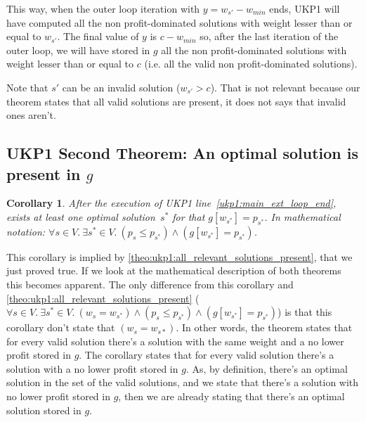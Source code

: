 \documentclass[12pt]{article}
\newtheorem{corollary}{Corollary}
\begin{document}
This way, when the outer loop iteration with \(y = w_{s'}-w_{min}\) ends, UKP1 will have computed all the non profit-dominated solutions with weight lesser than or equal to \(w_{s'}\). The final value of \(y\) is \(c-w_{min}\) so, after the last iteration of the outer loop, we will have stored in \(g\) all the non profit-dominated solutions with weight lesser than or equal to \(c\) (i.e. all the valid non profit-dominated solutions).

Note that \(s'\) can be an invalid solution (\(w_{s'} > c\)). That is not relevant because our theorem states that all valid solutions are present, it does not says that invalid ones aren't.

\subsection{UKP1 Second Theorem: An optimal solution is present in \(g\)}

\begin{corollary}\label{theo:ukp1:opt_is_present}
After the execution of UKP1 line~\ref{ukp1:main_ext_loop_end}, exists at least one optimal solution~\(s^*\) for that \(g[w_{s^*}] = p_{s^*}\). In mathematical notation: \(\forall s \in V.~\exists s^* \in V.~(p_{s} \leq p_{s^*}) \land (g[w_{s^*}] = p_{s^*})\).
\end{corollary}

This corollary is implied by \autoref{theo:ukp1:all_relevant_solutions_present}, that we just proved true. If we look at the mathematical description of both theorems this becomes apparent. The only difference from this corollary and \autoref{theo:ukp1:all_relevant_solutions_present} (\(\forall s \in V.~\exists s^* \in V.~(w_s = w_{s^*}) \land (p_s \leq p_{s^*}) \land (g[w_{s^*}] = p_{s^*})\)) is that this corollary don't state that \((w_s = w_{s*})\). In other words, the theorem states that for every valid solution there's a solution with the same weight and a no lower profit stored in \(g\). The corollary states that for every valid solution there's a solution with a no lower profit stored in \(g\). As, by definition, there's an optimal solution in the set of the valid solutions, and we state that there's a solution with no lower profit stored in \(g\), then we are already stating that there's an optimal solution stored in \(g\).
\end{document}
